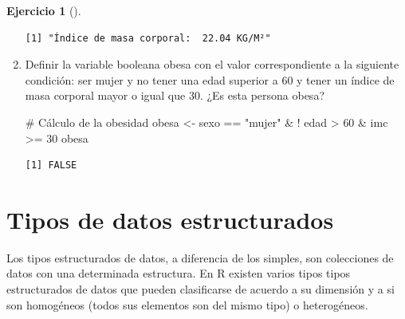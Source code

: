 \documentclass[
  a4paper,
]{scrreport}
\newenvironment{Shaded}{\begin{snugshade}}{\end{snugshade}}
\newcommand{\CommentTok}[1]{\textcolor[rgb]{0.37,0.37,0.37}{#1}}
\newcommand{\DecValTok}[1]{\textcolor[rgb]{0.68,0.00,0.00}{#1}}
\newcommand{\NormalTok}[1]{\textcolor[rgb]{0.00,0.23,0.31}{#1}}
\newcommand{\OtherTok}[1]{\textcolor[rgb]{0.00,0.23,0.31}{#1}}
\newcommand{\SpecialCharTok}[1]{\textcolor[rgb]{0.37,0.37,0.37}{#1}}
\newcommand{\StringTok}[1]{\textcolor[rgb]{0.13,0.47,0.30}{#1}}
\theoremstyle{definition}
\newtheorem{exercise}{Ejercicio}[chapter]
\theoremstyle{definition}
\theoremstyle{remark}
\begin{document}
\begin{exercise}[]
\begin{enumerate}
\begin{tcolorbox}
\begin{verbatim}
[1] "Índice de masa corporal:  22.04 KG/M²"
\end{verbatim}

  \end{tcolorbox}
\item
  Definir la variable booleana obesa con el valor correspondiente a la
  siguiente condición: ser mujer y no tener una edad superior a 60 y
  tener un índice de masa corporal mayor o igual que 30. ¿Es esta
  persona obesa?

  \begin{tcolorbox}[enhanced jigsaw, title=\textcolor{quarto-callout-note-color}{\faInfo}\hspace{0.5em}{Solución}, titlerule=0mm, toprule=.15mm, colbacktitle=quarto-callout-note-color!10!white, arc=.35mm, colframe=quarto-callout-note-color-frame, opacitybacktitle=0.6, coltitle=black, left=2mm, colback=white, opacityback=0, breakable, bottomrule=.15mm, toptitle=1mm, leftrule=.75mm, bottomtitle=1mm, rightrule=.15mm]

\begin{Shaded}
\begin{Highlighting}[]
\CommentTok{\# Cálculo de la obesidad}
\NormalTok{obesa }\OtherTok{\textless{}{-}}\NormalTok{ sexo }\SpecialCharTok{==} \StringTok{"mujer"} \SpecialCharTok{\&} \SpecialCharTok{!}\NormalTok{ edad }\SpecialCharTok{\textgreater{}} \DecValTok{60} \SpecialCharTok{\&}\NormalTok{ imc }\SpecialCharTok{\textgreater{}=} \DecValTok{30}
\NormalTok{obesa}
\end{Highlighting}
\end{Shaded}

\begin{verbatim}
[1] FALSE
\end{verbatim}

  \end{tcolorbox}
\end{enumerate}

\end{exercise}


\chapter{Tipos de datos
estructurados}\label{tipos-de-datos-estructurados}

Los tipos estructurados de datos, a diferencia de los simples, son
colecciones de datos con una determinada estructura. En R existen varios
tipos tipos estructurados de datos que pueden clasificarse de acuerdo a
su dimensión y a si son homogéneos (todos sus elementos son del mismo
tipo) o heterogéneos.
\end{document}
